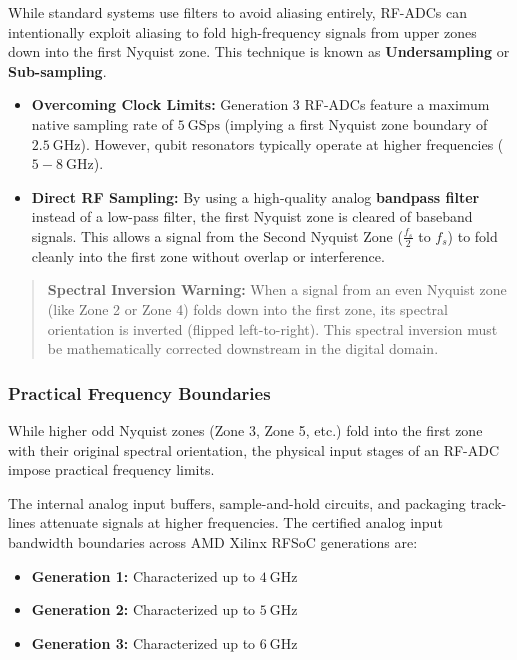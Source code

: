 \documentclass[
]{article}
\providecommand{\tightlist}{%
  \setlength{\itemsep}{0pt}\setlength{\parskip}{0pt}}
\begin{document}
While standard systems use filters to avoid aliasing entirely, RF-ADCs
can intentionally exploit aliasing to fold high-frequency signals from
upper zones down into the first Nyquist zone. This technique is known as
\textbf{Undersampling} or \textbf{Sub-sampling}.

\begin{itemize}
\tightlist
\item
  \textbf{Overcoming Clock Limits:} Generation 3 RF-ADCs feature a
  maximum native sampling rate of \(5\ \text{GSps}\) (implying a first
  Nyquist zone boundary of \(2.5\ \text{GHz}\)). However, qubit
  resonators typically operate at higher frequencies
  (\(5 - 8\ \text{GHz}\)).
\item
  \textbf{Direct RF Sampling:} By using a high-quality analog
  \textbf{bandpass filter} instead of a low-pass filter, the first
  Nyquist zone is cleared of baseband signals. This allows a signal from
  the Second Nyquist Zone (\(\frac{f_s}{2}\) to \(f_s\)) to fold cleanly
  into the first zone without overlap or interference.
\end{itemize}

\begin{quote}
\textbf{Spectral Inversion Warning:} When a signal from an even Nyquist
zone (like Zone 2 or Zone 4) folds down into the first zone, its
spectral orientation is inverted (flipped left-to-right). This spectral
inversion must be mathematically corrected downstream in the digital
domain.
\end{quote}

\subsubsection{Practical Frequency
Boundaries}\label{practical-frequency-boundaries}

While higher odd Nyquist zones (Zone 3, Zone 5, etc.) fold into the
first zone with their original spectral orientation, the physical input
stages of an RF-ADC impose practical frequency limits.

The internal analog input buffers, sample-and-hold circuits, and
packaging track-lines attenuate signals at higher frequencies. The
certified analog input bandwidth boundaries across AMD Xilinx RFSoC
generations are:

\begin{itemize}
\tightlist
\item
  \textbf{Generation 1:} Characterized up to \(4\ \text{GHz}\)
\item
  \textbf{Generation 2:} Characterized up to \(5\ \text{GHz}\)
\item
  \textbf{Generation 3:} Characterized up to \(6\ \text{GHz}\)
\end{itemize}
\end{document}

